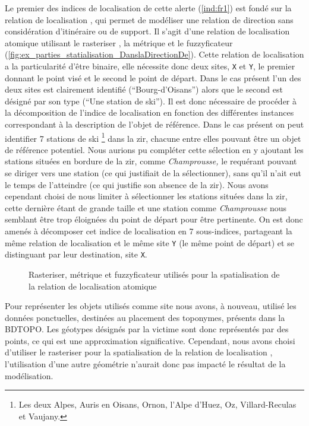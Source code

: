 Le premier des indices de localisation de cette alerte (\ref{ind:fr1})
est fondé sur la relation de localisation
, qui permet de
modéliser une relation de direction sans considération d'itinéraire ou
de support. Il s'agit d'une relation de localisation atomique
utilisant le rasteriser , la métrique
 et le fuzzyficateur 
(\autoref{fig:ex_parties_statialisation_DanslaDirectionDe}). Cette
relation de localisation a la particularité d'être binaire, elle
nécessite donc deux sites, \texttt{X} et \texttt{Y}, le premier
donnant le point visé et le second le point de départ. Dans le cas
présent l'un des deux sites est clairement identifié
(\enquote{Bourg-d'Oisans}) alors que le second est désigné par son
type (\enquote{Une station de ski}). Il est donc nécessaire de
procéder à la décomposition de l'indice de localisation en fonction
des différentes instances correspondant à la description de l'objet de
référence. Dans le cas présent on peut identifier 7 stations de ski
\footnote{Les deux Alpes, Auris en Oisans, Ornon, l'Alpe d'Huez, Oz,
  Villard-Reculas et Vaujany.}  dans la \ac{zir}, chacune entre elles
pouvant être un objet de référence potentiel. Nous aurions pu
compléter cette sélection en y ajoutant les stations situées en
bordure de la \ac{zir}, comme \emph{Champrousse,} le requérant pouvant
se diriger vers une station (ce qui justifiait de la sélectionner),
sans qu'il n'ait eut le temps de l'atteindre (ce qui justifie son
absence de la \ac{zir}). Nous avons cependant choisi de nous limiter à
sélectionner les stations situées dans la \ac{zir}, cette dernière
étant de grande taille et une station comme \emph{Champrousse} nous
semblant être trop éloignées du point de départ pour être pertinente.
On est donc amenés à décomposer cet indice de localisation en 7
sous-indices, partageant la même relation de localisation et le même
site \texttt{Y} (\ie le même point de départ) et se distinguant par
leur destination, site \texttt{X}.

\begin{figure}
  \centering
  
  \caption{Rasteriser, métrique et fuzzyficateur utilisés pour la
    spatialisation de la relation de localisation atomique
    \protect{}}
  \label{fig:ex_parties_statialisation_DanslaDirectionDe}
\end{figure}

Pour représenter les objets utilisés comme site nous avons, à nouveau,
utilisé les données ponctuelles, destinées au placement des toponymes,
présents dans la BDTOPO. Les géotypes désignés par la victime sont
donc représentés par des points, ce qui est une approximation
significative. Cependant, nous avons choisi d'utiliser le rasteriser
 pour la spatialisation de la relation de
localisation ,
l'utilisation d'une autre géométrie n'aurait donc pas impacté le
résultat de la modélisation.

